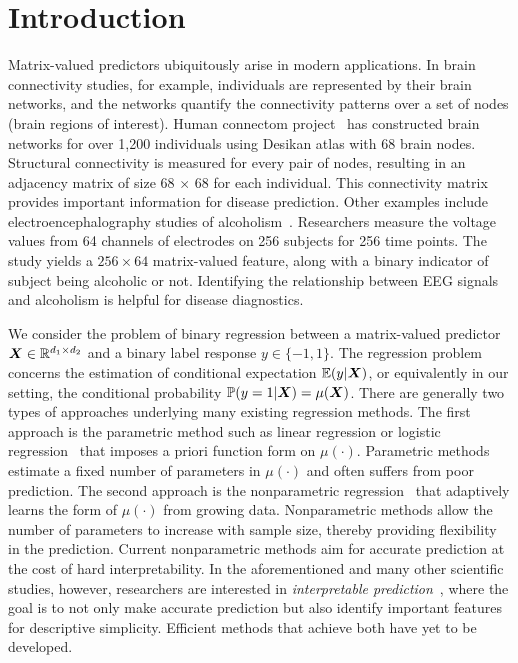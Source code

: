 \documentclass[11pt]{article}
\theoremstyle{plain}
\theoremstyle{definition}
\begin{document}
\section{Introduction}

Matrix-valued predictors ubiquitously arise in modern applications. In brain connectivity studies, for example, individuals are represented by their brain networks, and the networks quantify the connectivity patterns over a set of nodes (brain regions of interest). Human connectom project~\citep{van2013wu} has constructed brain networks for over 1,200 individuals using Desikan atlas with 68 brain nodes. Structural connectivity is measured for every pair of nodes, resulting in an adjacency matrix of size 68 $\times$ 68 for each individual. This connectivity matrix provides important information for disease prediction. Other examples include electroencephalography studies of alcoholism~\citep{zhou2014regularized}. Researchers measure the voltage values from 64 channels of electrodes on 256 subjects for 256 time points. The study yields a $256 \times 64$ matrix-valued feature, along with a binary indicator of subject being alcoholic or not. Identifying the relationship between EEG signals and alcoholism is helpful for disease diagnostics. 

We consider the problem of binary regression between a matrix-valued predictor $\bm X \in \mathbb{R}^{d_1\times d_2}$ and a binary label response $y\in\{-1,1\}$. The regression problem concerns the estimation of conditional expectation $\mathbb{E}(y|\bm X)$, or equivalently in our setting, the conditional probability $\mathbb{P}(y=1|\bm X)=\mu(\bm X)$. There are generally two types of approaches underlying many existing regression methods. The first approach is the parametric method such as linear regression or logistic regression~\citep{fan2019generalized, relion2019network} that imposes a priori function form on $\mu(\cdot)$. Parametric methods estimate a fixed number of parameters in $\mu(\cdot)$ and often suffers from poor prediction. The second approach is the nonparametric regression~\citep{wasserman2006all,tsybakov2008introduction} that adaptively learns the form of $\mu(\cdot)$ from growing data. Nonparametric methods allow the number of parameters to increase with sample size, thereby providing flexibility in the prediction. Current nonparametric methods aim for accurate prediction at the cost of hard interpretability. In the aforementioned and many other scientific studies, however, researchers are interested in {\it interpretable prediction}~\citep{murdoch2019definitions}, where the goal is to not only make accurate prediction but also identify important features for descriptive simplicity. Efficient methods that achieve both have yet to be developed. 
\end{document}
